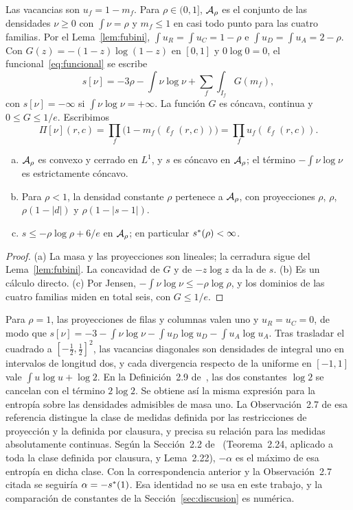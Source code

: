 Las vacancias son $u_f=1-m_f$. Para $\rho\in(0,1]$, ${\mathcal{A}}_\rho$ es el conjunto de las densidades
$\nu\ge0$ con $\int\nu=\rho$ y $m_f\le1$ en casi todo punto para las cuatro familias. Por el
Lema~\ref{lem:fubini}, $\int u_R=\int u_C=1-\rho$ e $\int u_D=\int u_A=2-\rho$. Con
$G(z)=-(1-z)\log(1-z)$ en $[0,1]$ y $0\log0=0$, el funcional~\eqref{eq:funcional} se escribe
\[
 s[\nu]=-3\rho-\int\nu\log\nu+\sum_f\int_{I_f}G(m_f),
\]
con $s[\nu]=-\infty$ si $\int\nu\log\nu=+\infty$. La función $G$ es cóncava, continua y
$0\le G\le1/e$. Escribimos
\[
 \Pi[\nu](r,c)=\prod_f\bigl(1-m_f(\ell_f(r,c))\bigr)=\prod_fu_f(\ell_f(r,c)).
\]

\begin{lema}\label{lem:elementales}
\begin{enumerate}[(a)]
\item ${\mathcal{A}}_\rho$ es convexo y cerrado en $L^1$, y $s$ es cóncavo en ${\mathcal{A}}_\rho$; el término
$-\int\nu\log\nu$ es estrictamente cóncavo.
\item Para $\rho<1$, la densidad constante $\rho$ pertenece a ${\mathcal{A}}_\rho$, con proyecciones $\rho$,
$\rho$, $\rho(1-|d|)$ y $\rho(1-|s-1|)$.
\item $s\le-\rho\log\rho+6/e$ en ${\mathcal{A}}_\rho$; en particular $s^{*}(\rho)<\infty$.
\end{enumerate}
\end{lema}

\begin{proof}
(a) La masa y las proyecciones son lineales; la cerradura sigue del Lema~\ref{lem:fubini}. La
concavidad de $G$ y de $-z\log z$ da la de $s$. (b) Es un cálculo directo. (c) Por Jensen,
$-\int\nu\log\nu\le-\rho\log\rho$, y los dominios de las cuatro familias miden en total seis, con
$G\le1/e$.
\end{proof}

\begin{observacion}\label{obs:simkin}
Para $\rho=1$, las proyecciones de filas y columnas valen uno y $u_R=u_C=0$, de modo que
$s[\nu]=-3-\int\nu\log\nu-\int u_D\log u_D-\int u_A\log u_A$. Tras trasladar el cuadrado a
$[-\frac12,\frac12]^2$, las vacancias diagonales son densidades de integral uno en intervalos de
longitud dos, y cada divergencia respecto de la uniforme en $[-1,1]$ vale $\int u\log u+\log2$. En la Definición~2.9 de~\cite{Simkin}, las dos constantes $\log2$ se cancelan con el
término $2\log2$. Se obtiene así la misma expresión para la entropía sobre las densidades
admisibles de masa uno. La Observación~2.7 de esa referencia distingue la clase de medidas
definida por las restricciones de proyección y la definida por clausura, y precisa su relación
para las medidas absolutamente continuas. Según la Sección~2.2 de~\cite{Simkin} (Teorema~2.24,
aplicado a toda la clase definida por clausura, y Lema~2.22), $-\alpha$ es el máximo de esa entropía
en dicha clase. Con la correspondencia anterior y la Observación~2.7 citada se seguiría
$\alpha=-s^{*}(1)$. Esa identidad no se usa en este trabajo, y la comparación de constantes de la
Sección~\ref{sec:discusion} es numérica.
\end{observacion}

